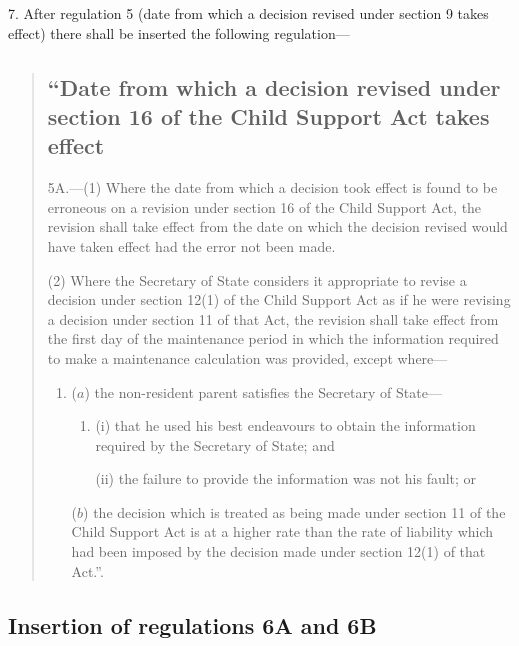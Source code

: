 \documentclass[12pt,a4paper]{article}
\begin{document}
7.  After regulation 5 (date from which a decision revised under section 9 takes effect) there shall be inserted the following regulation—
\begin{quotation}
\subsection*{“Date from which a decision revised under section 16 of the Child Support Act takes effect}

5A.---(1)  Where the date from which a decision took effect is found to be erroneous on a revision under section 16 of the Child Support Act, the revision shall take effect from the date on which the decision revised would have taken effect had the error not been made.

(2) Where the Secretary of State considers it appropriate to revise a decision under section 12(1) of the Child Support Act as if he were revising a decision under section 11 of that Act, the revision shall take effect from the first day of the maintenance period in which the information required to make a maintenance calculation was provided, except where—
\begin{enumerate}\item[]
($a$) the non-resident parent satisfies the Secretary of State—
\begin{enumerate}\item[]
(i) that he used his best endeavours to obtain the information required by the Secretary of State; and

(ii) the failure to provide the information was not his fault; or
\end{enumerate}

($b$) the decision which is treated as being made under section 11 of the Child Support Act is at a higher rate than the rate of liability which had been imposed by the decision made under section 12(1) of that Act.”.
\end{enumerate}
\end{quotation}

\subsection[8. Insertion of regulations 6A and 6B]{Insertion of regulations 6A and 6B}
\end{document}
